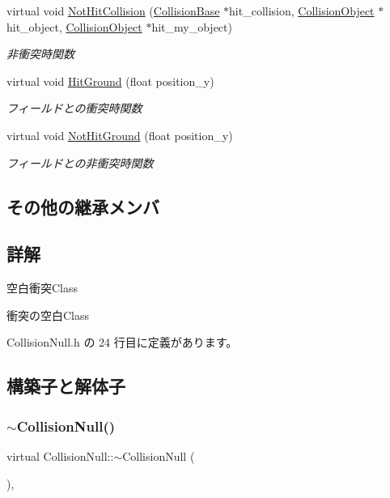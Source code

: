 \begin{DoxyCompactItemize}
virtual void \mbox{\hyperlink{class_collision_null_aba2a574ab42dca618c41dd0b9562f614}{Not\+Hit\+Collision}} (\mbox{\hyperlink{class_collision_base}{Collision\+Base}} $\ast$hit\+\_\+collision, \mbox{\hyperlink{class_collision_object}{Collision\+Object}} $\ast$hit\+\_\+object, \mbox{\hyperlink{class_collision_object}{Collision\+Object}} $\ast$hit\+\_\+my\+\_\+object)
\begin{DoxyCompactList}\small\item\em 非衝突時関数 \end{DoxyCompactList}\item 
virtual void \mbox{\hyperlink{class_collision_null_a75900c2cec4e49336701e2e3c64e5bfe}{Hit\+Ground}} (float position\+\_\+y)
\begin{DoxyCompactList}\small\item\em フィールドとの衝突時関数 \end{DoxyCompactList}\item 
virtual void \mbox{\hyperlink{class_collision_null_ad456a03a3e3d55d8d408b7ed28ce7911}{Not\+Hit\+Ground}} (float position\+\_\+y)
\begin{DoxyCompactList}\small\item\em フィールドとの非衝突時関数 \end{DoxyCompactList}\end{DoxyCompactItemize}
\subsection*{その他の継承メンバ}


\subsection{詳解}
空白衝突\+Class 

衝突の空白\+Class 

 Collision\+Null.\+h の 24 行目に定義があります。



\subsection{構築子と解体子}
\mbox{\label{class_collision_null_a2eaef584b2ae2c4062df8bf3a6533fb3}} 
\subsubsection{\texorpdfstring{$\sim$\+Collision\+Null()}{~CollisionNull()}}
{\footnotesize\ttfamily virtual Collision\+Null\+::$\sim$\+Collision\+Null (\begin{DoxyParamCaption}{ }\end{DoxyParamCaption})\hspace{0.3cm}{\ttfamily [inline]}, {\ttfamily [virtual]}}



